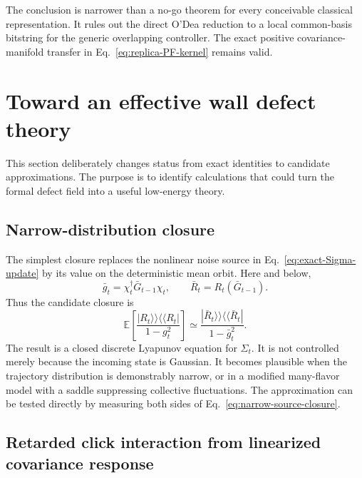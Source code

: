 \documentclass[
  aps,prx,twocolumn,superscriptaddress,longbibliography,
  nofootinbib,floatfix
]{revtex4-2}
\newcommand{\E}{\mathbb{E}}
\theoremstyle{plain}
\theoremstyle{definition}
\begin{document}
The conclusion is narrower than a no-go theorem for every conceivable
classical representation.  It rules out the direct O'Dea reduction to a local
common-basis bitstring for the generic overlapping controller.  The exact
positive covariance-manifold transfer in Eq.~\eqref{eq:replica-PF-kernel}
remains valid.

\section{Toward an effective wall defect theory}
\label{sec:effective-theory}

This section deliberately changes status from exact identities to candidate
approximations.  The purpose is to identify calculations that could turn the
formal defect field into a useful low-energy theory.

\subsection{Narrow-distribution closure}

The simplest closure replaces the nonlinear noise source in
Eq.~\eqref{eq:exact-Sigma-update} by its value on the deterministic mean orbit.
Here and below,
\begin{equation}
 \bar g_t=\chi_t^\dagger\bar G_{t-1}\chi_t,
 \qquad
 \bar R_t=R_t(\bar G_{t-1}).
 \label{eq:mean-orbit-local-data}
\end{equation}
Thus the candidate closure is
\begin{equation}
 \E\!\left[
 \frac{|R_t\rangle\!\rangle\langle\!\langle R_t|}{1-g_t^2}
 \right]
 \simeq
 \frac{|\bar R_t\rangle\!\rangle
 \langle\!\langle\bar R_t|}{1-\bar g_t^2}.
 \label{eq:narrow-source-closure}
\end{equation}
The result is a closed discrete Lyapunov equation for \(\Sigma_t\).  It is not
controlled merely because the incoming state is Gaussian.  It becomes
plausible when the trajectory distribution is demonstrably narrow, or in a
modified many-flavor model with a saddle suppressing collective fluctuations.
The approximation can be tested directly by measuring both sides of
Eq.~\eqref{eq:narrow-source-closure}.

\subsection[Retarded click interaction]
{Retarded click interaction from linearized covariance response}
\end{document}

